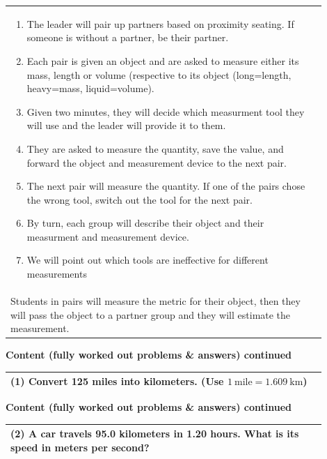 \documentclass{article}
\begin{document}
\begin{tabular}{|p{0.9\linewidth}|}
\hline

\vspace{0.2cm}
\begin{enumerate}
    \item The leader will pair up partners based on proximity seating. If someone is without a partner, be their partner.
    \item Each pair is given an object and are asked to measure either its mass, length or volume (respective to its object (long=length, heavy=mass, liquid=volume).
    \item Given two minutes, they will decide which measurment tool they will use and the leader will provide it to them.
    \item They are asked to measure the quantity, save the value, and forward the object and measurement device to the next pair.
    \item The next pair will measure the quantity. If one of the pairs chose the wrong tool, switch out the tool for the next pair.
    \item By turn, each group will describe their object and their measurment and measurement device.
    \item We will point out which tools are ineffective for different measurements
\end{enumerate} \\[0.5em]
Students in pairs will measure the metric for their object, then they will pass the object to a partner group and they will estimate the measurement. \\
\hline
\end{tabular}
\newpage

\noindent
{\large \textbf{Content (fully worked out problems \& answers) continued}} \\[0.2em]

\begin{tabular}{|p{0.9\linewidth}|}
\hline
\vspace{0.2cm}

\textbf{(1)} Convert 125 miles into kilometers. (Use $1~\text{mile} = 1.609~\text{km}$) \\
\hline
\end{tabular}
\newpage

\noindent
{\large \textbf{Content (fully worked out problems \& answers) continued}} \\[0.2em]
\begin{tabular}{|p{0.9\linewidth}|}
\hline
\vspace{0.2cm}

\textbf{(2)} A car travels 95.0 kilometers in 1.20 hours. What is its speed in meters per second? \\
\hline
\end{tabular}
\newpage
\end{document}
